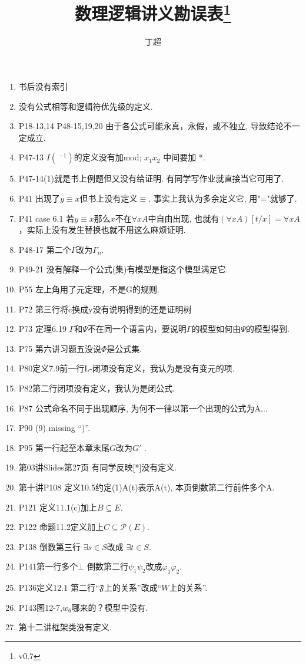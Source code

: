 \documentclass{article}
\begin{document}
\title{数理逻辑讲义勘误表\footnote{v0.7}}
\author{丁超}
\maketitle	
\begin{enumerate}
\item 书后没有索引
\item 没有公式相等和逻辑符优先级的定义. 
\item P18-13,14 P48-15,19,20 由于各公式可能永真，永假，或不独立, 导致结论不一定成立. 
\item P47-13 $I(~^{-1})$的定义没有加mod; $x_1x_2$ 中间要加 *. 
\item P47-14(1)就是书上例题但又没有给证明. 有同学写作业就直接当它可用了. 
\item P41 出现了$y\equiv x$但书上没有定义$\equiv$. 事实上我认为多余定义它, 用"="就够了. 
\item P41 case 6.1 若$y\equiv x$那么$x$不在$\forall xA$中自由出现, 也就有$(\forall xA)[t/x] = \forall xA$，实际上没有发生替换也就不用这么麻烦证明. 
\item P48-17 第二个$\Gamma$改为$\Gamma_n$. 
\item P49-21 没有解释一个公式(集)有模型是指这个模型满足它. 
\item P55 左上角用了元定理，不是G的规则. 
\item P72 第三行将c换成y没有说明得到的还是证明树
\item P73 定理6.19 $\Gamma$和$\Psi$不在同一个语言内，要说明$\Gamma$的模型如何由$\Psi$的模型得到. 
\item P75 第六讲习题五没说$\Phi$是公式集. 
\item P80定义7.9前一行L-闭项没有定义，我认为是没有变元的项. 
\item P82第二行闭项没有定义，我认为是闭公式. 
\item P87 公式命名不同于出现顺序, 为何不一律以第一个出现的公式为A...
\item P90 (9) missing ``)''. 
\item P95 第一行起至本章末尾$G$改为$G'$ . 
\item 第03讲Slides第27页 有同学反映[*]没有定义. 
\item 第十讲P108 定义10.5约定(1)A(t)表示A(t), 本页倒数第二行前件多个A. 
\item P121 定义11.1(c)加上$B\subseteq E$. 
\item P122 命题11.2定义加上$C\subseteq \mathcal{P}(E)$. 
\item P138 倒数第三行 $\exists s \in S$改成 $\exists t \in S$. 
\item P141第一行多个$\bot$ 倒数第二行$\psi_1 \psi_2$改成$\varphi_1 \varphi_2$. 
\item P136定义12.1 第二行``$\mathfrak{F}$上的关系''改成``$W$上的关系''. 
\item P143图12-7,$w_6$哪来的？模型中没有. 
\item 第十二讲框架类没有定义. 



\end{enumerate}
\end{document}
